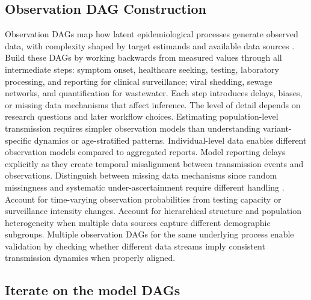 \documentclass{article}
\begin{document}
\subsection{Observation DAG Construction} \label{sec:observation}

Observation DAGs map how latent epidemiological processes generate observed data, with complexity shaped by target estimands and available data sources \citep{deangelis2018analysing}.
Build these DAGs by working backwards from measured values through all intermediate steps: symptom onset, healthcare seeking, testing, laboratory processing, and reporting for clinical surveillance; viral shedding, sewage networks, and quantification for wastewater.
Each step introduces delays, biases, or missing data mechanisms that affect inference.
The level of detail depends on research questions and later workflow choices.
Estimating population-level transmission requires simpler observation models than understanding variant-specific dynamics or age-stratified patterns.
Individual-level data enables different observation models compared to aggregated reports.
Model reporting delays explicitly as they create temporal misalignment between transmission events and observations.
Distinguish between missing data mechanisms since random missingness and systematic under-ascertainment require different handling \citep{sherratt2021exploring}.
Account for time-varying observation probabilities from testing capacity or surveillance intensity changes.
Account for hierarchical structure and population heterogeneity when multiple data sources capture different demographic subgroups.
Multiple observation DAGs for the same underlying process enable validation by checking whether different data streams imply consistent transmission dynamics when properly aligned.

\subsection{Iterate on the model DAGs}
\end{document}
